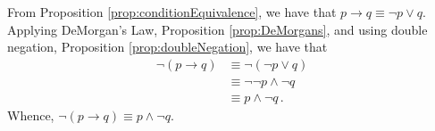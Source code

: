 \guard










\begin{exmp}
\label{exmp:conditionalNegation}
  From Proposition \ref{prop:conditionEquivalence}, we have that $p\rightarrow q \equiv \neg p \vee q$.
  Applying DeMorgan's Law, Proposition \ref{prop:DeMorgans}, and using double negation, Proposition \ref{prop:doubleNegation}, we have that
  \begin{align}
    \neg (p \rightarrow q)  &\equiv \neg( \neg p \vee q ) \\
                            &\equiv \neg\neg p \wedge \neg q \\
                            &\equiv p \wedge \neg q\,.
  \end{align}
  Whence, $ \neg( p\rightarrow q ) \equiv p \wedge \neg q $.
\end{exmp}
